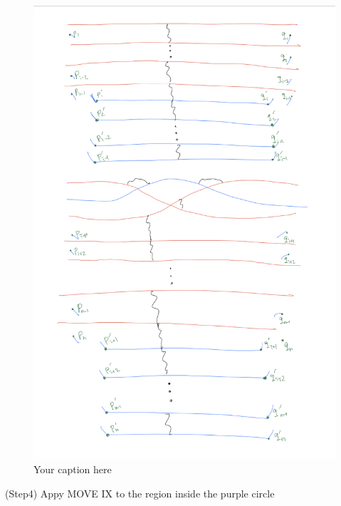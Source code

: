 \begin{figure}[H] %
    \centering
    \includegraphics[width=\linewidth]{diagrams/definition12/10.png} %
    \caption{Your caption here}
    \label{fig:your-label}
\end{figure}

(Step4) Appy MOVE \RN{9} to the region inside the purple circle

